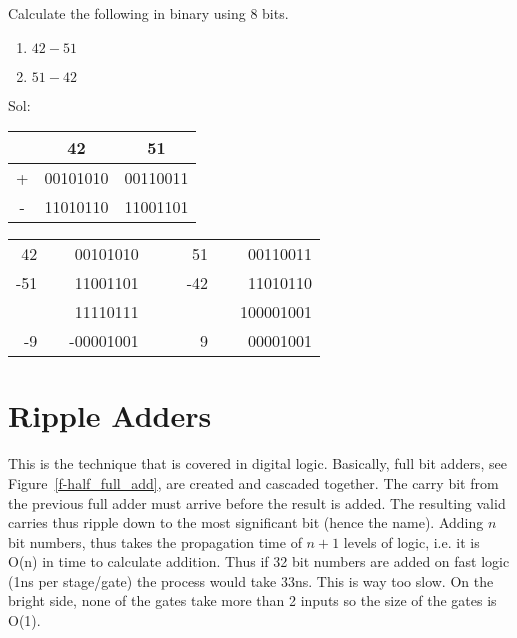 \begin{example}
Calculate the following in binary using 8 bits.
    \begin{enumerate}
    \item $42-51$
    \item $51-42$
    \end{enumerate}

    {\color{ans}Sol:

    \begin{tabular}{|c|c|c|}
      \hline
       & 42 & 51 \\
      \hline
      + & 00101010 & 00110011 \\
      - & 11010110 & 11001101 \\
      \hline
    \end{tabular}

    \begin{tabular}{rrrr|rrrr}
       42 &  & 00101010 & &  &  51 &  & 00110011 \\
      -51 &  & 11001101 & &  & -42 &  & 11010110 \\
      \cline{1-1} \cline{3-3} \cline{6-6} \cline{8-8}
         &  &  11110111 & &  &   &  & 100001001 \\
      -9 &  & -00001001 & &  & 9 &  &  00001001 \\
    \end{tabular}
}
\end{example}

\section{Ripple Adders}

This is the technique that is covered in digital logic.  Basically, full bit adders, see Figure~\ref{f-half_full_add}, are created and cascaded together.  The carry bit from the previous full adder must arrive before the result is added.  The resulting valid carries thus ripple down to the most significant bit (hence the name).  Adding $n$ bit numbers, thus takes the propagation time of $n+1$ levels of logic, i.e. it is O(n) in time to calculate addition.  Thus if 32 bit numbers are added on fast logic (1ns per stage/gate) the process would take 33ns.  This is way too slow.  On the bright side, none of the gates take more than 2 inputs so the size of the gates is O(1).

